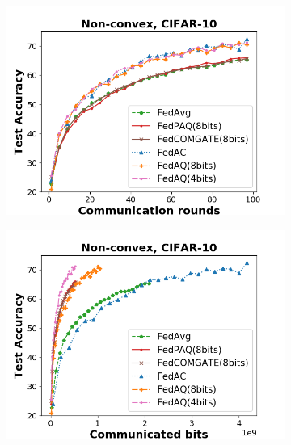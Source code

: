 \begin{figure}[hbt!]
    \setcounter{subfigure}{0}
    \begin{subfigure}[b]{0.31\textwidth}
    \includegraphics[width=\textwidth]{figure/accuracy_iid_comm_cnn_step100.png}
    \end{subfigure}
    \begin{subfigure}[b]{0.31\textwidth}
    \includegraphics[width=\textwidth]{figure/accuracy_iid_bits_cnn_step100.png}
    \end{subfigure}
    \begin{subfigure}[b]{0.31\textwidth}

\end{subfigure}
\end{figure}
